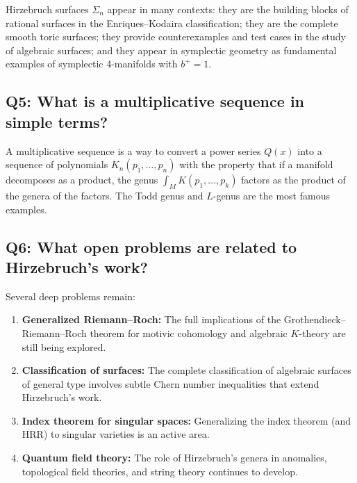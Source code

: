 Hirzebruch surfaces \(\Sigma_n\) appear in many contexts: they are the
building blocks of rational surfaces in the Enriques--Kodaira
classification; they are the complete smooth toric surfaces; they
provide counterexamples and test cases in the study of algebraic
surfaces; and they appear in symplectic geometry as fundamental examples of
symplectic 4-manifolds with \(b^+ = 1\).

\subsection*{Q5: What is a multiplicative sequence in simple terms?}

A multiplicative sequence is a way to convert a power series
\(Q(x)\) into a sequence of polynomials \(K_n(p_1, \dots, p_n)\) with
the property that if a manifold decomposes as a product, the genus
\(\int_M K(p_1, \dots, p_k)\) factors as the product of the genera of
the factors. The Todd genus and \(L\)-genus are the most famous
examples.

\subsection*{Q6: What open problems are related to Hirzebruch's work?}

Several deep problems remain:
\begin{enumerate}
    \item \textbf{Generalized Riemann--Roch:} The full implications of
    the Grothendieck--Riemann--Roch theorem for motivic cohomology and
    algebraic \(K\)-theory are still being explored.
    \item \textbf{Classification of surfaces:} The complete
    classification of algebraic surfaces of general type involves
    subtle Chern number inequalities that extend Hirzebruch's work.
    \item \textbf{Index theorem for singular spaces:} Generalizing the
    index theorem (and HRR) to singular varieties is an active area.
    \item \textbf{Quantum field theory:} The role of Hirzebruch's genera
    in anomalies, topological field theories, and string theory
    continues to develop.
\end{enumerate}

